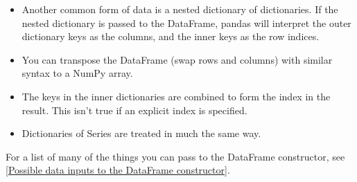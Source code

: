 \begin{itemize}
    \item Another common form of data is a nested dictionary of dictionaries. If the nested dictionary is passed to the DataFrame, pandas will interpret the outer dictionary keys as the columns, and the inner keys as the row indices.
    \item You can transpose the DataFrame (swap rows and columns) with similar syntax to a NumPy array.
    \item The keys in the inner dictionaries are combined to form the index in the result. This isn't true if an explicit index is specified.
    \item Dictionaries of Series are treated in much the same way.
\end{itemize}


For a list of many of the things you can pass to the DataFrame constructor, see \autoref{Possible data inputs to the DataFrame constructor}.

